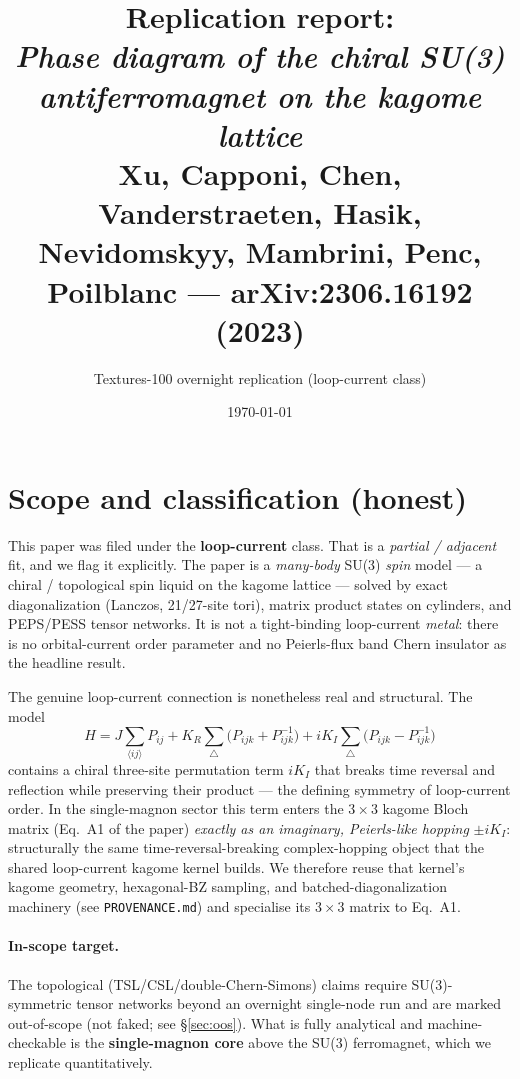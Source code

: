 \documentclass[11pt]{article}
\title{Replication report: \\
\emph{Phase diagram of the chiral SU(3) antiferromagnet on the kagome lattice}\\
\normalsize Xu, Capponi, Chen, Vanderstraeten, Hasik, Nevidomskyy, Mambrini, Penc, Poilblanc --- arXiv:2306.16192 (2023)}
\author{Textures-100 overnight replication (loop-current class)}
\date{\today}
\begin{document}
\maketitle

\section{Scope and classification (honest)}
This paper was filed under the \textbf{loop-current} class. That is a
\emph{partial / adjacent} fit, and we flag it explicitly. The paper is a
\emph{many-body} SU(3) \emph{spin} model --- a chiral / topological spin liquid on
the kagome lattice --- solved by exact diagonalization (Lanczos, 21/27-site tori),
matrix product states on cylinders, and PEPS/PESS tensor networks. It is not a
tight-binding loop-current \emph{metal}: there is no orbital-current order parameter
and no Peierls-flux band Chern insulator as the headline result.

The genuine loop-current connection is nonetheless real and structural. The model
\begin{equation}
H = J\!\sum_{\langle ij\rangle}\! P_{ij}
 + K_R\!\sum_{\triangle}\!\big(P_{ijk}+P_{ijk}^{-1}\big)
 + iK_I\!\sum_{\triangle}\!\big(P_{ijk}-P_{ijk}^{-1}\big)
\label{eq:H}
\end{equation}
contains a chiral three-site permutation term $iK_I$ that breaks time reversal and
reflection while preserving their product --- the defining symmetry of loop-current
order. In the single-magnon sector this term enters the $3\times3$ kagome Bloch
matrix (Eq.~A1 of the paper) \emph{exactly as an imaginary, Peierls-like hopping}
$\pm iK_I$: structurally the same time-reversal-breaking complex-hopping object that
the shared loop-current kagome kernel builds. We therefore reuse that kernel's
kagome geometry, hexagonal-BZ sampling, and batched-diagonalization machinery
(see \texttt{PROVENANCE.md}) and specialise its $3\times3$ matrix to Eq.~A1.

\paragraph{In-scope target.} The topological (TSL/CSL/double-Chern-Simons) claims
require SU(3)-symmetric tensor networks beyond an overnight single-node run and are
marked out-of-scope (not faked; see \S\ref{sec:oos}). What is fully analytical and
machine-checkable is the \textbf{single-magnon core} above the SU(3) ferromagnet,
which we replicate quantitatively.
\end{document}
